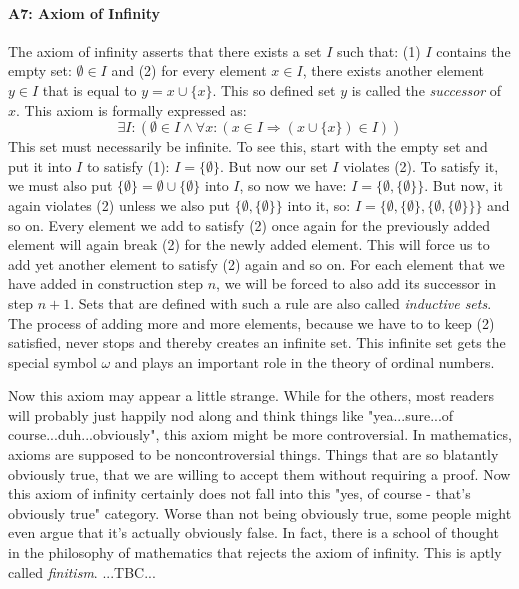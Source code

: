 

\paragraph{A7: Axiom of Infinity}
The axiom of infinity asserts that there exists a set $I$ such that: (1) $I$ contains the empty set: $\emptyset \in I$ and (2) for every element $x \in I$, there exists another element $y \in I$ that is equal to $y = x \cup \{ x\}$. This so defined set $y$ is called the \emph{successor} of $x$. This axiom is formally expressed as:
\begin{equation}
\exists I: ( \emptyset\in I \wedge \forall x: (x \in I \Rightarrow (x \cup \{x\}) \in I ))
\end{equation}
This set must necessarily be infinite. To see this, start with the empty set and put it into $I$ to satisfy (1): $I = \{\emptyset\}$. But now our set $I$ violates (2). To satisfy it, we must also put $\{ \emptyset \} = \emptyset \cup \{ \emptyset \} $ into $I$, so now we have: $I = \{\emptyset, \{ \emptyset \} \}$. But now, it again violates (2) unless we also put $\{\emptyset,  \{ \emptyset \} \}$ into it, so: $I = \{\emptyset, \{ \emptyset \}, \{\emptyset,  \{ \emptyset \} \}  \}$ and so on. Every element we add to satisfy (2) once again for the previously added element will again break (2) for the newly added element. This will force us to add yet another element to satisfy (2) again and so on. For each element that we have added in construction step $n$, we will be forced to also add its successor in step $n+1$. Sets that are defined with such a rule are also called \emph{inductive sets}. The process of adding more and more elements, because we have to to keep (2) satisfied, never stops and thereby creates an infinite set. This infinite set gets the special symbol $\omega$ and plays an important role in the theory of ordinal numbers. 


\medskip
Now this axiom may appear a little strange. While for the others, most readers will probably just happily nod along and think things like "yea...sure...of course...duh...obviously", this axiom might be more controversial. In mathematics, axioms are supposed to be noncontroversial things. Things that are so blatantly obviously true, that we are willing to accept them without requiring a proof. Now this axiom of infinity certainly does not fall into this "yes, of course - that's obviously true" category. Worse than not being obviously true, some people might even argue that it's actually obviously false. In fact, there is a school of thought in the philosophy of mathematics that rejects the axiom of infinity. This is aptly called \emph{finitism}. ...TBC...

